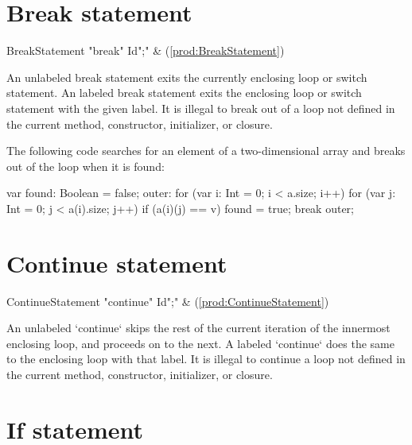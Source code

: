 \section{Break statement}

\begin{bbgrammar}
 BreakStatement    \: \xcd"break" Id\opt \xcd";" & (\ref{prod:BreakStatement})\\%
\end{bbgrammar}


An unlabeled break statement exits the currently enclosing loop or switch
statement. An labeled break statement exits the enclosing loop or switch
statement with the given label.
It is illegal to break out of a loop not defined in the current
method, constructor, initializer, or closure.  

The following code searches for an element of a two-dimensional
array and breaks out of the loop when it is found:

\begin{xten}
var found: Boolean = false;
outer: for (var i: Int = 0; i < a.size; i++)
    for (var j: Int = 0; j < a(i).size; j++)
        if (a(i)(j) == v) {
            found = true;
            break outer;
        }
\end{xten}

\section{Continue statement}

\begin{bbgrammar}
 ContinueStatement    \: \xcd"continue" Id\opt \xcd";" & (\ref{prod:ContinueStatement})\\%
\end{bbgrammar}

An unlabeled \xcd`continue` skips the rest of the current iteration of the
innermost enclosing loop, and proceeds on to the next.  A labeled
\xcd`continue` does the same to the enclosing loop with that label.
It is illegal to continue a loop not defined in the current
method, constructor, initializer, or closure.

\section{If statement}

